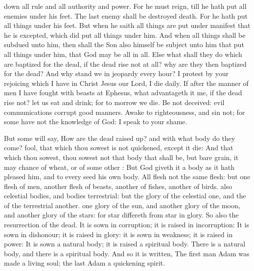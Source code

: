 {down
all
rule
and
all
authority
and
power.
For
he
must
reign,
till
he hath
put
all
enemies
under
his
feet.
The
last
enemy
{} shall be
destroyed
{}
death.
For he hath
put all
things
under
his
feet.
But
when he
saith all
things are put
under
{}
manifest
that he is
excepted,
which did
put all
things
under
him.
And
when all
things shall be
subdued unto
him,
then
shall the
Son
also
himself be
subject unto
him that
put all
things under
him,
that
God may
be
all
in
all.
Else
what shall they
do
which are
baptized
for the
dead,
if the
dead
rise
not at
all?
why are
they
then
baptized
for the
dead?
And
why
stand
we in
jeopardy
every
hour?
I protest
by
your
rejoicing
which I
have
in
Christ
Jesus
our
Lord, I
die
daily.
If after the
manner of
men I have fought with
beasts
at
Ephesus,
what advantageth
it
me,
if the
dead
rise
not? let us
eat
and
drink;
for to
morrow we
die.
Be
not
deceived:
evil
communications
corrupt
good
manners.
Awake to
righteousness,
and
sin
not;
for
some
have not the
knowledge of
God: I
speak
{}
to
your
shame.
\par }{\PP {}But
some
{} will
say,
How
are the
dead raised
up?
and with
what
body do they
come?
fool, that
which
thou
sowest
is
not
quickened,
except it
die:
And
that
which thou
sowest, thou
sowest
not
that
body
that shall
be,
but
bare
grain, it may
chance of
wheat,
or of
some
other
{}:
But
God
giveth
it a
body
as it hath pleased
him,
and to
every
seed his
own
body.
All
flesh
{}
not the
same
flesh:
but
{}
one
{}
flesh of
men,
another
flesh of
beasts,
another of
fishes,
{}
another of
birds.
also
celestial
bodies,
and
bodies
terrestrial:
but the
glory of the
celestial
{}
one,
and
the
{} of the
terrestrial
{}
another.
one
glory of the
sun,
and
another
glory of the
moon,
and
another
glory of the
stars:
for
{}
star differeth
from
{}
star
in
glory.
So
also
{} the
resurrection of the
dead. It is
sown
in
corruption; it is
raised
in
incorruption:
It is
sown
in
dishonour; it is
raised
in
glory: it is
sown
in
weakness; it is
raised
in
power:
It is
sown a
natural
body; it is
raised a
spiritual
body. There
is a
natural
body,
and there
is a
spiritual
body.
And
so it is
written, The
first
man
Adam was
made a
living
soul; the
last
Adam
{} a
quickening
spirit.
}
